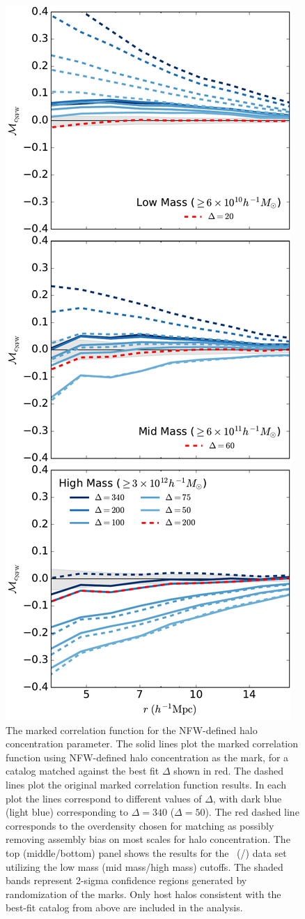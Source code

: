 \documentclass[usenatbib,fleqn]{mnras}
\begin{document}
\begin{figure}
	\centering
	\includegraphics[width=.4\textwidth]{match_mcf_cNFW.pdf}
	\caption{The marked correlation function for the NFW-defined halo concentration parameter. The solid lines plot the marked correlation function using NFW-defined halo concentration as the mark, for a catalog matched against the best fit $\Delta$ shown in red. The dashed lines plot the original marked correlation function results. In each plot the lines correspond to different values of $\Delta$, with dark blue (light blue) corresponding to $\Delta = 340$ ($\Delta = 50$). The red dashed line corresponds to the overdensity chosen for matching as possibly removing assembly bias on most scales for halo concentration. The top (middle/bottom) panel shows the results for the
\simA \ (\simB /\simC) data set utilizing the low mass (mid mass/high mass) cutoffs. The shaded bands represent 2-sigma confidence regions generated by randomization of the marks. Only host halos consistent with the best-fit catalog from above are included in the analysis.}
	\label{fig:hvm_mcf_cnfw}
\end{figure}
\end{document}

